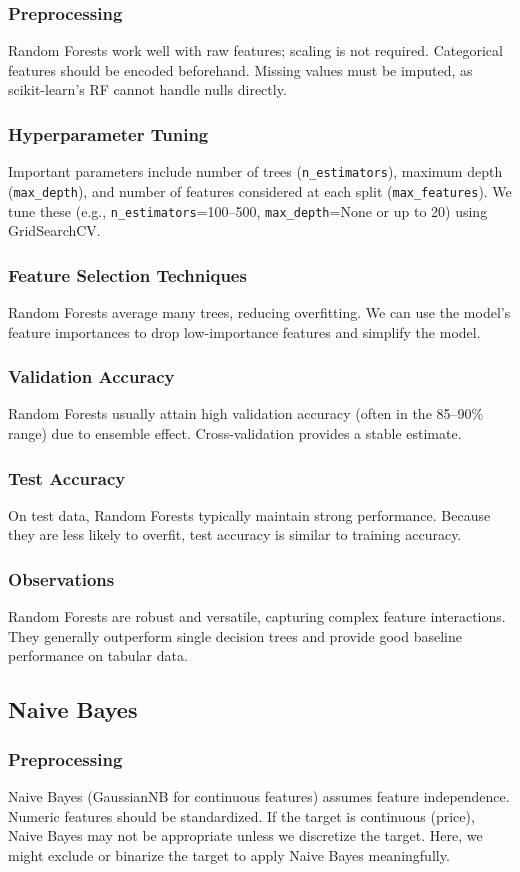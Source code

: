 \documentclass[12pt]{article}
\begin{document}
\subsubsection{Preprocessing}
Random Forests work well with raw features; scaling is not required. Categorical features should be encoded beforehand. Missing values must be imputed, as scikit-learn's RF cannot handle nulls directly.
\subsubsection{Hyperparameter Tuning}
Important parameters include number of trees (\texttt{n\_estimators}), maximum depth (\texttt{max\_depth}), and number of features considered at each split (\texttt{max\_features}). We tune these (e.g., \texttt{n\_estimators}=100--500, \texttt{max\_depth}=None or up to 20) using GridSearchCV.
\subsubsection{Feature Selection Techniques}
Random Forests average many trees, reducing overfitting. We can use the model's feature importances to drop low-importance features and simplify the model.
\subsubsection{Validation Accuracy}
Random Forests usually attain high validation accuracy (often in the 85--90\% range) due to ensemble effect. Cross-validation provides a stable estimate.
\subsubsection{Test Accuracy}
On test data, Random Forests typically maintain strong performance. Because they are less likely to overfit, test accuracy is similar to training accuracy.
\subsubsection{Observations}
Random Forests are robust and versatile, capturing complex feature interactions. They generally outperform single decision trees and provide good baseline performance on tabular data.

\subsection{Naive Bayes}
\subsubsection{Preprocessing}
Naive Bayes (GaussianNB for continuous features) assumes feature independence. Numeric features should be standardized. If the target is continuous (price), Naive Bayes may not be appropriate unless we discretize the target. Here, we might exclude or binarize the target to apply Naive Bayes meaningfully.
\end{document}
